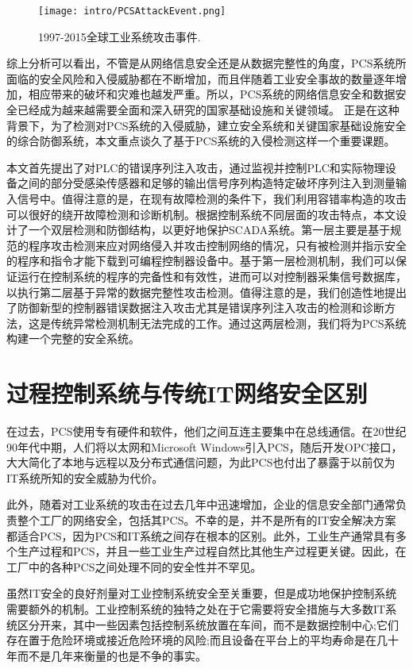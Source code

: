 \begin{figure}[!htp]
 \centering
 \texttt{[image: intro/PCSAttackEvent.png]}
 \caption[fig:pcsattack]{1997-2015全球工业系统攻击事件.}
 \label{pcsattack}
\end{figure}


综上分析可以看出，不管是从网络信息安全还是从数据完整性的角度，PCS系统所面临的安全风险和入侵威胁都在不断增加，而且伴随着工业安全事故的数量逐年增加，相应带来的破坏和灾难也越发严重。所以，PCS系统的网络信息安全和数据安全已经成为越来越需要全面和深入研究的国家基础设施和关键领域。
正是在这种背景下，为了检测对PCS系统的入侵威胁，建立安全系统和关键国家基础设施安全的综合防御系统，本文重点谈久了基于PCS系统的入侵检测这样一个重要课题。

本文首先提出了对PLC的错误序列注入攻击，通过监视并控制PLC和实际物理设备之间的部分受感染传感器和足够的输出信号序列构造特定破坏序列注入到测量输入信号中。值得注意的是，在现有故障检测的条件下，我们利用容错率构造的攻击可以很好的绕开故障检测和诊断机制。根据控制系统不同层面的攻击特点，本文设计了一个双层检测和防御结构，以更好地保护SCADA系统。第一层主要是基于规范的程序攻击检测来应对网络侵入并攻击控制网络的情况，只有被检测并指示安全的程序和指令才能下载到可编程控制器设备中。基于第一层检测机制，我们可以保证运行在控制系统的程序的完备性和有效性，进而可以对控制器采集信号数据库，以执行第二层基于异常的数据完整性攻击检测。值得注意的是，我们创造性地提出了防御新型的控制器错误数据注入攻击尤其是错误序列注入攻击的检测和诊断方法，这是传统异常检测机制无法完成的工作。通过这两层检测，我们将为PCS系统构建一个完整的安全系统。

\section{过程控制系统与传统IT网络安全区别}


在过去，PCS使用专有硬件和软件，他们之间互连主要集中在总线通信。在20世纪90年代中期，人们将以太网和Microsoft Windows引入PCS，随后开发OPC接口，大大简化了本地与远程以及分布式通信问题，为此PCS也付出了暴露于以前仅为IT系统所知的安全威胁为代价。

此外，随着对工业系统的攻击在过去几年中迅速增加，企业的信息安全部门通常负责整个工厂的网络安全，包括其PCS。不幸的是，并不是所有的IT安全解决方案都适合PCS，因为PCS和IT系统之间存在根本的区别。此外，工业生产通常具有多个生产过程和PCS，并且一些工业生产过程自然比其他生产过程更关键。因此，在工厂中的各种PCS之间处理不同的安全性并不罕见。

虽然IT安全的良好剂量对工业控制系统安全至关重要，但是成功地保护控制系统需要额外的机制。工业控制系统的独特之处在于它需要将安全措施与大多数IT系统区分开来，其中一些因素包括控制系统放置在车间，而不是数据控制中心;它们存在置于危险环境或接近危险环境的风险;而且设备在平台上的平均寿命是在几十年而不是几年来衡量的也是不争的事实。

